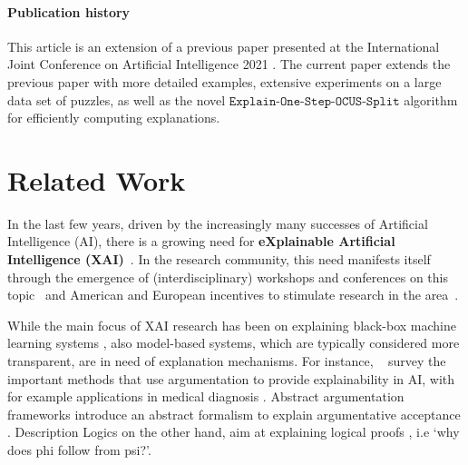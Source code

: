 \documentclass[twoside,11pt]{article}
\newcommand\citet[1]{\citeauthor{#1}~\citeyear{#1}}
\newcommand\comment[1]{\marginpar{\tiny #1}}
\renewcommand\comment[1]{#1}
\newcommand{\tias}[1]{{\comment{\color{blue}Tias:#1}}}
\newcommand{\bart}[1]{{\comment{\color{OliveGreen}Bart: #1}}}
\newcommand\mm[1]{\ensuremath{#1}\xspace}
\newcommand\call[1]{\mm{\texttt{#1}}}
\newcommand\iterativeonestep{\ensuremath{\call{Explain-One-Step-OCUS-Split}}\xspace}
\begin{document}
\paragraph*{Publication history} This article is an extension of a previous paper presented at the International Joint Conference on Artificial Intelligence 2021 \cite{ijcai2021}. The current paper extends the previous paper with more detailed examples, extensive experiments on a large data set of puzzles, as well as the novel \iterativeonestep algorithm for efficiently computing explanations.

\section{Related Work}\label{sec:related-works}

In the last few years, driven by the increasingly many successes of Artificial Intelligence (AI), there is a growing need for \textbf{eXplainable Artificial Intelligence (XAI)}~\cite{miller2019explanation}.
In the research community, this need manifests itself through the emergence of (interdisciplinary) workshops and conferences on this topic~\cite{xai-ijcai,FAT} and American and European incentives to stimulate research in the area~\cite{gunning2017explainable,hamonrobustness,fetproact}. 

While the main focus of XAI research has been on explaining black-box machine learning systems \cite{lundberg2017unified,guidotti2018survey,ignatiev2019abduction}, also model-based systems, which are typically considered more transparent, are in need of explanation mechanisms. 
For instance, \citet{vassiliades2021argumentation} survey the important methods that use argumentation \cite{modgil2013added} to provide explainability in AI, with for example applications in medical diagnosis \cite{obeid2019using}. Abstract argumentation frameworks introduce an abstract formalism to explain argumentative acceptance \cite{vsevselja2013abstract,liao2020explanation,ulbricht2021strong}. Description Logics \cite{baader2004description} on the other hand, aim at explaining logical proofs \cite{alrabbaa2021finding,koopmann2021two}, i.e `why does phi follow from psi?'. 
\end{document}
